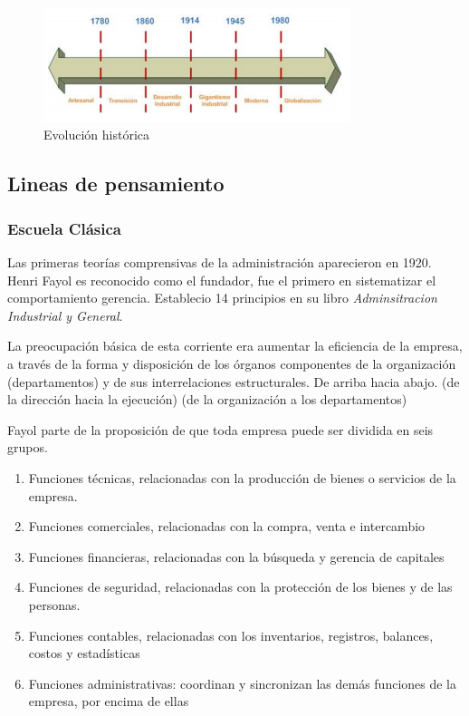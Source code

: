 \documentclass[titlepage,a4paper]{article}
\begin{document}
\begin{figure}[!htb]
    \centering
    \includegraphics[width=0.8\textwidth]{imagenes/EvolucionHistorica.PNG}
    \caption{Evolución histórica}
\end{figure}

\subsection{Lineas de pensamiento}
\subsubsection*{Escuela Clásica}
Las primeras teorías comprensivas de la administración aparecieron en 1920. Henri Fayol es reconocido como el fundador, fue el primero en sistematizar el comportamiento gerencia. Establecio 14 principios en su libro \textit{Adminsitracion Industrial y General}.

La preocupación básica de esta corriente era aumentar la eficiencia de la empresa, a través de la forma y disposición de los órganos componentes de la organización (departamentos) y de sus interrelaciones estructurales. De arriba hacia abajo. (de la dirección hacia la ejecución) (de la organización a los departamentos)

Fayol parte de la proposición de que toda empresa puede ser dividida en seis grupos.
\begin{enumerate}
    \item Funciones técnicas, relacionadas con la producción de bienes o servicios de la empresa. 
    \item Funciones comerciales, relacionadas con la compra, venta e intercambio
    \item Funciones financieras, relacionadas con la búsqueda y gerencia de capitales
    \item Funciones de seguridad, relacionadas con la protección de los bienes y de las personas. 
    \item Funciones contables, relacionadas con los inventarios, registros, balances, costos y estadísticas
    \item Funciones administrativas: coordinan y sincronizan las demás funciones de la empresa, por encima de ellas
\end{enumerate}
\end{document}
